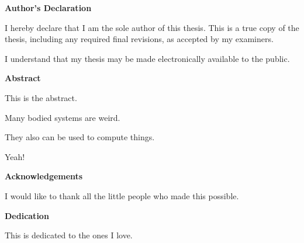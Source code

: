 \pagestyle{plain}
\setcounter{page}{2}

\cleardoublepage %

 



\begin{center}\textbf{Author's Declaration}\end{center}

  \noindent
I hereby declare that I am the sole author of this thesis. This is a true copy of the thesis, including any required final revisions, as accepted by my examiners.

  \bigskip
  
  \noindent
I understand that my thesis may be made electronically available to the public.

\cleardoublepage



\begin{center}\textbf{Abstract}\end{center}

This is the abstract.

Many bodied systems are weird.  

They also can be used to compute things.

Yeah!

\cleardoublepage


\begin{center}\textbf{Acknowledgements}\end{center}

I would like to thank all the little people who made this possible.
\cleardoublepage


\begin{center}\textbf{Dedication}\end{center}

This is dedicated to the ones I love.
\cleardoublepage


\renewcommand\contentsname{Table of Contents}
\tableofcontents
\cleardoublepage
{}

